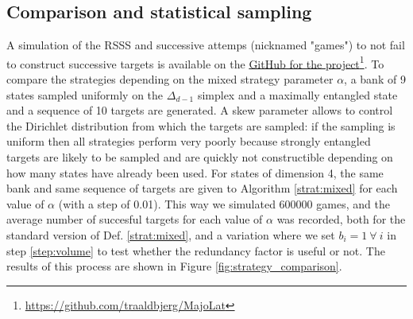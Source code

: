 \subsection{Comparison and statistical sampling}

A simulation of the RSSS and successive attemps (nicknamed "games") to not fail to construct successive targets is available on the \href{https://github.com/traaldbjerg/MajoLat}{GitHub for the project}\footnote{\url{https://github.com/traaldbjerg/MajoLat}}. To compare the strategies depending on the mixed strategy parameter $\alpha$, a bank of 9 states sampled uniformly on the $\Delta_{d-1}$ simplex and a maximally entangled state and a sequence of 10 targets are generated. A skew parameter allows to control the Dirichlet distribution from which the targets are sampled: if the sampling is uniform then all strategies perform very poorly because strongly entangled targets are likely to be sampled and are quickly not constructible depending on how many states have already been used. For states of dimension 4, the same bank and same sequence of targets are given to Algorithm \ref{strat:mixed} for each value of $\alpha$ (with a step of 0.01). This way we simulated 600000 games, and the average number of succesful targets for each value of $\alpha$ was recorded, both for the standard version of Def. \ref{strat:mixed}, and a variation where we set $b_i = 1 \: \forall \: i$ in step \ref{step:volume} to test whether the redundancy factor is useful or not. The results of this process are shown in Figure \ref{fig:strategy_comparison}.

